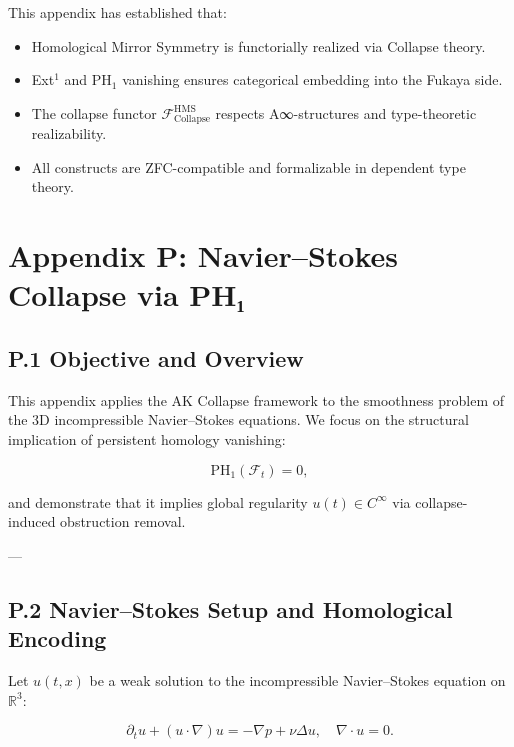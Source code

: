 \documentclass[11pt]{article}
\begin{document}
This appendix has established that:

\begin{itemize}
  \item Homological Mirror Symmetry is functorially realized via Collapse theory.
  \item Ext$^1$ and PH$_1$ vanishing ensures categorical embedding into the Fukaya side.
  \item The collapse functor $\mathcal{F}_{\mathrm{Collapse}}^{\mathrm{HMS}}$ respects A∞-structures and type-theoretic realizability.
  \item All constructs are ZFC-compatible and formalizable in dependent type theory.
\end{itemize}




\section*{Appendix P: Navier–Stokes Collapse via PH₁}

\subsection*{P.1 Objective and Overview}

This appendix applies the AK Collapse framework to the smoothness problem of the 3D incompressible Navier–Stokes equations.  
We focus on the structural implication of persistent homology vanishing:

\[
\mathrm{PH}_1(\mathcal{F}_t) = 0,
\]

and demonstrate that it implies global regularity $u(t) \in C^\infty$ via collapse-induced obstruction removal.

---

\subsection*{P.2 Navier–Stokes Setup and Homological Encoding}

Let $u(t,x)$ be a weak solution to the incompressible Navier–Stokes equation on $\mathbb{R}^3$:

\[
\partial_t u + (u \cdot \nabla)u = -\nabla p + \nu \Delta u, \quad \nabla \cdot u = 0.
\]
\end{document}

